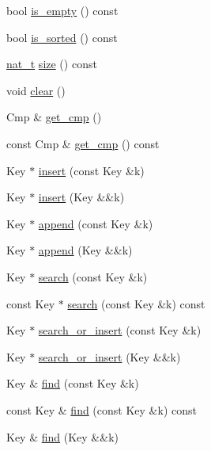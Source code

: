 \begin{DoxyCompactItemize}
\item 
bool \hyperlink{class_designar_1_1_tree_set_affe4342cb2019ced672a0dbf03a781b1}{is\+\_\+empty} () const
\item 
bool \hyperlink{class_designar_1_1_tree_set_a6321737660e743877ece201a0af184d0}{is\+\_\+sorted} () const
\item 
\hyperlink{namespace_designar_aa72662848b9f4815e7bf31a7cf3e33d1}{nat\+\_\+t} \hyperlink{class_designar_1_1_tree_set_acb3cd6e2382851772714603d5fe5c644}{size} () const
\item 
void \hyperlink{class_designar_1_1_tree_set_af3b2a6ab8c7f7fd7c319a392c33fd9d6}{clear} ()
\item 
Cmp \& \hyperlink{class_designar_1_1_tree_set_aec12ad907a431f411eb06b0643ba9d53}{get\+\_\+cmp} ()
\item 
const Cmp \& \hyperlink{class_designar_1_1_tree_set_ae1a8289ce177e865d9987f896038a289}{get\+\_\+cmp} () const
\item 
Key $\ast$ \hyperlink{class_designar_1_1_tree_set_a4533e89f7cea7d9a6494d443863a3223}{insert} (const Key \&k)
\item 
Key $\ast$ \hyperlink{class_designar_1_1_tree_set_ae057018e4d2dd133eb7464f5fbe051de}{insert} (Key \&\&k)
\item 
Key $\ast$ \hyperlink{class_designar_1_1_tree_set_a81abff4df0c9baf2fbf5c96a2d72cb67}{append} (const Key \&k)
\item 
Key $\ast$ \hyperlink{class_designar_1_1_tree_set_a25bb5eea05f2ab11a2c988686fc3a42c}{append} (Key \&\&k)
\item 
Key $\ast$ \hyperlink{class_designar_1_1_tree_set_a1f94f8b93dc1e0f9769ce2e7cfb4762f}{search} (const Key \&k)
\item 
const Key $\ast$ \hyperlink{class_designar_1_1_tree_set_a6b8bce7908110a0ade8ca556191d29be}{search} (const Key \&k) const
\item 
Key $\ast$ \hyperlink{class_designar_1_1_tree_set_a0864bfc148a71b4ea0877d07d4924cd0}{search\+\_\+or\+\_\+insert} (const Key \&k)
\item 
Key $\ast$ \hyperlink{class_designar_1_1_tree_set_a481f16723d8f1e3c2d351d93910a34cd}{search\+\_\+or\+\_\+insert} (Key \&\&k)
\item 
Key \& \hyperlink{class_designar_1_1_tree_set_ad35f91ea97d8497e938876a2064024e8}{find} (const Key \&k)
\item 
const Key \& \hyperlink{class_designar_1_1_tree_set_a8c2e4641f594f7e541ae2d5d9c483299}{find} (const Key \&k) const
\item 
Key \& \hyperlink{class_designar_1_1_tree_set_a40ba1bcb8ca94157e3890b3e81be4794}{find} (Key \&\&k)

\end{DoxyCompactItemize}
